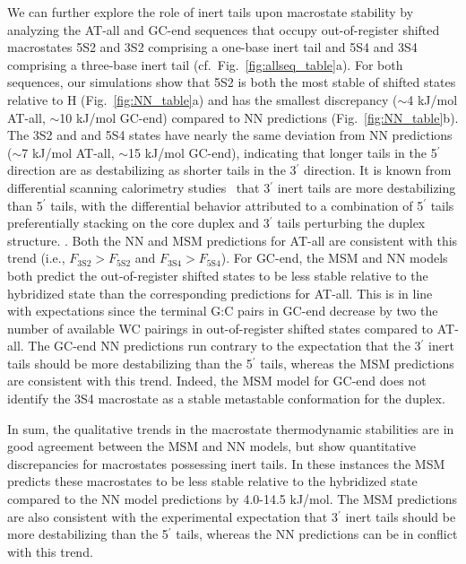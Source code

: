 \documentclass[journal=jpcbfk,manuscript=article]{achemso}
\begin{document}
We can further explore the role of inert tails upon macrostate stability by analyzing the AT-all and GC-end sequences that occupy out-of-register shifted macrostates 5S2 and 3S2 comprising a one-base inert tail and 5S4 and 3S4 comprising a three-base inert tail (cf.\ Fig.~\ref{fig:allseq_table}a). For both sequences, our simulations show that 5S2 is both the most stable of shifted states relative to H (Fig.~\ref{fig:NN_table}a) and has the smallest discrepancy ($\sim$4 kJ/mol AT-all, $\sim$10 kJ/mol GC-end) compared to NN predictions (Fig.~\ref{fig:NN_table}b). The 3S2 and and 5S4 states have nearly the same deviation from NN predictions ($\sim$7 kJ/mol AT-all, $\sim$15 kJ/mol GC-end), indicating that longer tails in the 5$^\prime$ direction are as destabilizing as shorter tails in the 3$^\prime$ direction. It is known from differential scanning calorimetry studies~\citep{Dickman2012ThermodynamicDNAs} that 3$^\prime$ inert tails are more destabilizing than 5$^\prime$ tails, with the differential behavior attributed to a combination of 5$^\prime$ tails preferentially stacking on the core duplex and 3$^\prime$ tails perturbing the duplex structure. \citep{Doktycz1990ThermodynamicC, Dickman2012ThermodynamicDNAs, DiMichele2014EffectHybridization}. Both the NN and MSM predictions for AT-all are consistent with this trend (i.e., $F_\mathrm{3S2} > F_\mathrm{5S2}$ and $F_\mathrm{3S4} > F_\mathrm{5S4}$). For GC-end, the MSM and NN models both predict the out-of-register shifted states to be less stable relative to the hybridized state than the corresponding predictions for AT-all. This is in line with expectations since the terminal G:C pairs in GC-end decrease by two the number of available WC pairings in out-of-register shifted states compared to AT-all. The GC-end NN predictions run contrary to the expectation that the 3$^\prime$ inert tails should be more destabilizing than the 5$^\prime$ tails, whereas the MSM predictions are consistent with this trend. Indeed, the MSM model for GC-end does not identify the 3S4 macrostate as a stable metastable conformation for the duplex.

In sum, the qualitative trends in the macrostate thermodynamic stabilities are in good agreement between the MSM and NN models, but show quantitative discrepancies for macrostates possessing inert tails. In these instances the MSM predicts these macrostates to be less stable relative to the hybridized state compared to the NN model predictions by 4.0-14.5 kJ/mol. The MSM predictions are also consistent with the experimental expectation that 3$^\prime$ inert tails should be more destabilizing than the 5$^\prime$ tails, whereas the NN predictions can be in conflict with this trend.
\end{document}
